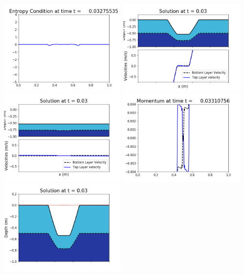 \documentclass[11pt]{article}
\begin{document}
\vskip 10pt 
\includegraphics[width=0.475\textwidth]{frame0094fig1009.png}
\vskip 10pt 
\includegraphics[width=0.475\textwidth]{frame0095fig1001.png}
\includegraphics[width=0.475\textwidth]{frame0095fig1002.png}
\vskip 10pt 
\includegraphics[width=0.475\textwidth]{frame0095fig1003.png}
\includegraphics[width=0.475\textwidth]{frame0095fig1006.png}
\end{document}
